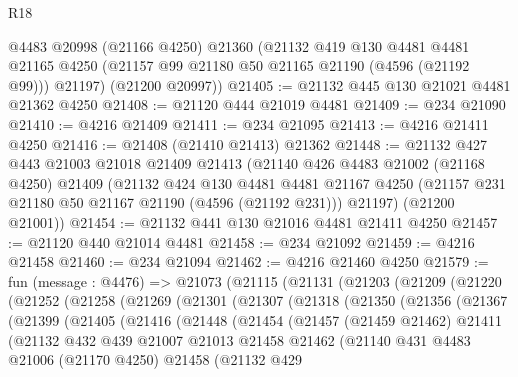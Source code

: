\begin{lexlean}{R18}
\begin{coremodule}
      @4483
      @20998
      (@21166 @4250)
      @21360
      (@21132
        @419
        @130
        @4481
        @4481
        @21165
        @4250
        (@21157 @99 @21180 @50 @21165 @21190 (@4596 (@21192 @99)))
        @21197)
      (@21200 @20997))
@21405 := @21132 @445 @130 @21021 @4481 @21362 @4250
@21408 := @21120 @444 @21019 @4481
@21409 := @234 @21090
@21410 := @4216 @21409
@21411 := @234 @21095
@21413 := @4216 @21411 @4250
@21416 := @21408 (@21410 @21413) @21362
@21448 := @21132
    @427
    @443
    @21003
    @21018
    @21409
    @21413
    (@21140
      @426
      @4483
      @21002
      (@21168 @4250)
      @21409
      (@21132
        @424
        @130
        @4481
        @4481
        @21167
        @4250
        (@21157 @231 @21180 @50 @21167 @21190 (@4596 (@21192 @231)))
        @21197)
      (@21200 @21001))
@21454 := @21132 @441 @130 @21016 @4481 @21411 @4250
@21457 := @21120 @440 @21014 @4481
@21458 := @234 @21092
@21459 := @4216 @21458
@21460 := @234 @21094
@21462 := @4216 @21460 @4250
@21579 := fun (message : @4476) =>
  @21073
    (@21115
      (@21131
        (@21203
          (@21209
            (@21220
              (@21252
                (@21258
                  (@21269
                    (@21301
                      (@21307
                        (@21318
                          (@21350
                            (@21356
                              (@21367
                                (@21399
                                  (@21405
                                    (@21416
                                      (@21448
                                        (@21454
                                          (@21457
                                            (@21459 @21462)
                                            @21411
                                            (@21132
                                              @432
                                              @439
                                              @21007
                                              @21013
                                              @21458
                                              @21462
                                              (@21140
                                                @431
                                                @4483
                                                @21006
                                                (@21170 @4250)
                                                @21458
                                                (@21132
                                                  @429

\end{coremodule}
\end{lexlean}
